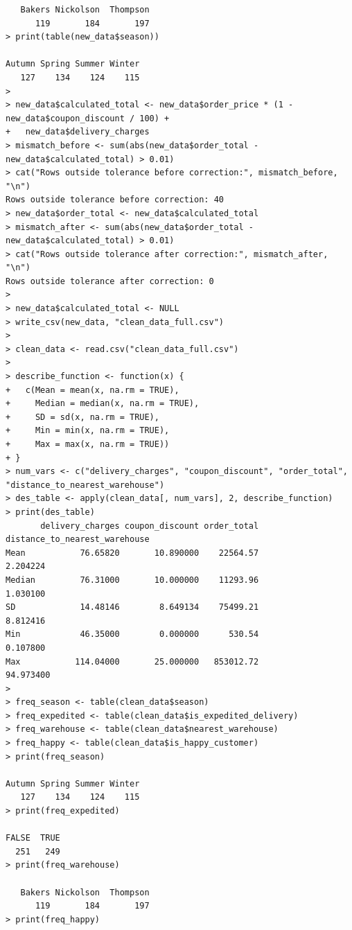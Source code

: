 \documentclass[12pt, a4paper]{article}
\begin{document}
\begin{lstlisting}
   Bakers Nickolson  Thompson 
      119       184       197 
> print(table(new_data$season))

Autumn Spring Summer Winter 
   127    134    124    115 
> 
> new_data$calculated_total <- new_data$order_price * (1 - new_data$coupon_discount / 100) +
+   new_data$delivery_charges
> mismatch_before <- sum(abs(new_data$order_total - new_data$calculated_total) > 0.01)
> cat("Rows outside tolerance before correction:", mismatch_before, "\n")
Rows outside tolerance before correction: 40 
> new_data$order_total <- new_data$calculated_total
> mismatch_after <- sum(abs(new_data$order_total - new_data$calculated_total) > 0.01)
> cat("Rows outside tolerance after correction:", mismatch_after, "\n")
Rows outside tolerance after correction: 0 
> 
> new_data$calculated_total <- NULL
> write_csv(new_data, "clean_data_full.csv")
>                                                                                                                      
> clean_data <- read.csv("clean_data_full.csv")
> 
> describe_function <- function(x) {
+   c(Mean = mean(x, na.rm = TRUE),
+     Median = median(x, na.rm = TRUE),
+     SD = sd(x, na.rm = TRUE),
+     Min = min(x, na.rm = TRUE),
+     Max = max(x, na.rm = TRUE))
+ }
> num_vars <- c("delivery_charges", "coupon_discount", "order_total", "distance_to_nearest_warehouse")
> des_table <- apply(clean_data[, num_vars], 2, describe_function)
> print(des_table)
       delivery_charges coupon_discount order_total distance_to_nearest_warehouse
Mean           76.65820       10.890000    22564.57                      2.204224
Median         76.31000       10.000000    11293.96                      1.030100
SD             14.48146        8.649134    75499.21                      8.812416
Min            46.35000        0.000000      530.54                      0.107800
Max           114.04000       25.000000   853012.72                     94.973400
> 
> freq_season <- table(clean_data$season)
> freq_expedited <- table(clean_data$is_expedited_delivery)
> freq_warehouse <- table(clean_data$nearest_warehouse)
> freq_happy <- table(clean_data$is_happy_customer)
> print(freq_season)

Autumn Spring Summer Winter 
   127    134    124    115 
> print(freq_expedited)

FALSE  TRUE 
  251   249 
> print(freq_warehouse)

   Bakers Nickolson  Thompson 
      119       184       197 
> print(freq_happy)


\end{lstlisting}
\end{document}
